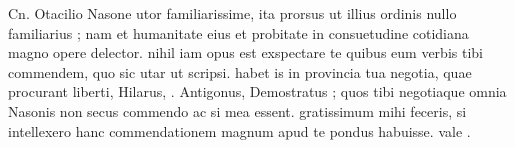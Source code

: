 


 Cn. Otacilio Nasone utor familiarissime, ita prorsus ut illius ordinis nullo familiarius ; nam et humanitate eius et probitate in consuetudine cotidiana magno opere delector. nihil iam opus est exspectare te quibus eum verbis tibi commendem, quo sic utar ut scripsi. habet is in provincia tua negotia, quae procurant liberti, Hilarus, . Antigonus, Demostratus ; quos tibi negotiaque omnia Nasonis non secus commendo ac si mea essent. gratissimum mihi feceris, si intellexero hanc commendationem magnum apud te pondus habuisse. vale .
